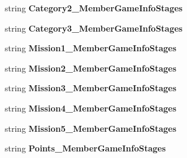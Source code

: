 \begin{DoxyCompactItemize}
\item 
string {\bfseries Category2\+\_\+\+Member\+Game\+Info\+Stages}\hypertarget{a00111_a313300e31f672eba319f5b31ecbd6a90}{}\label{a00111_a313300e31f672eba319f5b31ecbd6a90}

\item 
string {\bfseries Category3\+\_\+\+Member\+Game\+Info\+Stages}\hypertarget{a00111_aa590b7125ecf4bc02a16bbeb394af7ed}{}\label{a00111_aa590b7125ecf4bc02a16bbeb394af7ed}

\item 
string {\bfseries Mission1\+\_\+\+Member\+Game\+Info\+Stages}\hypertarget{a00111_aa9b42510e7addd6286dcba4b5a751a47}{}\label{a00111_aa9b42510e7addd6286dcba4b5a751a47}

\item 
string {\bfseries Mission2\+\_\+\+Member\+Game\+Info\+Stages}\hypertarget{a00111_a9074b50f66c475cf4209b4e39f01f627}{}\label{a00111_a9074b50f66c475cf4209b4e39f01f627}

\item 
string {\bfseries Mission3\+\_\+\+Member\+Game\+Info\+Stages}\hypertarget{a00111_a905efd7f861ef0bb4d6e2a7c7e590d8a}{}\label{a00111_a905efd7f861ef0bb4d6e2a7c7e590d8a}

\item 
string {\bfseries Mission4\+\_\+\+Member\+Game\+Info\+Stages}\hypertarget{a00111_aa607cd7d903ac4de6fbe5046cc8c0a03}{}\label{a00111_aa607cd7d903ac4de6fbe5046cc8c0a03}

\item 
string {\bfseries Mission5\+\_\+\+Member\+Game\+Info\+Stages}\hypertarget{a00111_a5e1ee5c7ccb79a2fde4e26e69d1b0175}{}\label{a00111_a5e1ee5c7ccb79a2fde4e26e69d1b0175}

\item 
string {\bfseries Points\+\_\+\+Member\+Game\+Info\+Stages}\hypertarget{a00111_a95c7f73b90cfa2380dbdca34a00eeaa7}{}\label{a00111_a95c7f73b90cfa2380dbdca34a00eeaa7}


\end{DoxyCompactItemize}
